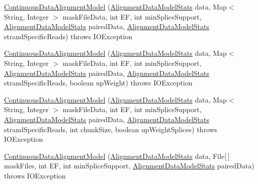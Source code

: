 \begin{DoxyCompactItemize}
\item 
\hyperlink{classbroad_1_1pda_1_1seq_1_1segmentation_1_1_continuous_data_alignment_model_a0f083a972a3995000d0a0b3e146ddd1b}{Continuous\+Data\+Alignment\+Model} (\hyperlink{classbroad_1_1pda_1_1seq_1_1segmentation_1_1_alignment_data_model_stats}{Alignment\+Data\+Model\+Stats} data, Map$<$ String, Integer $>$ mask\+File\+Data, int E\+F, int min\+Splice\+Support, \hyperlink{classbroad_1_1pda_1_1seq_1_1segmentation_1_1_alignment_data_model_stats}{Alignment\+Data\+Model\+Stats} paired\+Data, \hyperlink{classbroad_1_1pda_1_1seq_1_1segmentation_1_1_alignment_data_model_stats}{Alignment\+Data\+Model\+Stats} strand\+Specific\+Reads)  throws I\+O\+Exception
\item 
\hyperlink{classbroad_1_1pda_1_1seq_1_1segmentation_1_1_continuous_data_alignment_model_a9966e36fdc254e2ae504e1ec8aa3f756}{Continuous\+Data\+Alignment\+Model} (\hyperlink{classbroad_1_1pda_1_1seq_1_1segmentation_1_1_alignment_data_model_stats}{Alignment\+Data\+Model\+Stats} data, Map$<$ String, Integer $>$ mask\+File\+Data, int E\+F, int min\+Splice\+Support, \hyperlink{classbroad_1_1pda_1_1seq_1_1segmentation_1_1_alignment_data_model_stats}{Alignment\+Data\+Model\+Stats} paired\+Data, \hyperlink{classbroad_1_1pda_1_1seq_1_1segmentation_1_1_alignment_data_model_stats}{Alignment\+Data\+Model\+Stats} strand\+Specific\+Reads, boolean up\+Weight)  throws I\+O\+Exception
\item 
\hyperlink{classbroad_1_1pda_1_1seq_1_1segmentation_1_1_continuous_data_alignment_model_abfa387c5108127e9167555282c98ed05}{Continuous\+Data\+Alignment\+Model} (\hyperlink{classbroad_1_1pda_1_1seq_1_1segmentation_1_1_alignment_data_model_stats}{Alignment\+Data\+Model\+Stats} data, Map$<$ String, Integer $>$ mask\+File\+Data, int E\+F, int min\+Splice\+Support, \hyperlink{classbroad_1_1pda_1_1seq_1_1segmentation_1_1_alignment_data_model_stats}{Alignment\+Data\+Model\+Stats} paired\+Data, \hyperlink{classbroad_1_1pda_1_1seq_1_1segmentation_1_1_alignment_data_model_stats}{Alignment\+Data\+Model\+Stats} strand\+Specific\+Reads, int chunk\+Size, boolean up\+Weight\+Splices)  throws I\+O\+Exception
\item 
\hyperlink{classbroad_1_1pda_1_1seq_1_1segmentation_1_1_continuous_data_alignment_model_a9f8a43ee6ff09a8f6e30f8608844085f}{Continuous\+Data\+Alignment\+Model} (\hyperlink{classbroad_1_1pda_1_1seq_1_1segmentation_1_1_alignment_data_model_stats}{Alignment\+Data\+Model\+Stats} data, File\mbox{[}$\,$\mbox{]} mask\+Files, int E\+F, int min\+Splice\+Support, \hyperlink{classbroad_1_1pda_1_1seq_1_1segmentation_1_1_alignment_data_model_stats}{Alignment\+Data\+Model\+Stats} paired\+Data)  throws I\+O\+Exception

\end{DoxyCompactItemize}
